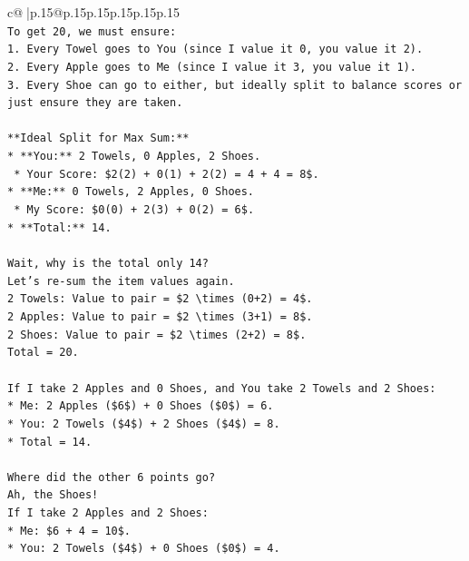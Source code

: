 \documentclass{article}
\begin{document}
{\begin{supertabular}{c@{$\;$}|p{.15\linewidth}@{}p{.15\linewidth}p{.15\linewidth}p{.15\linewidth}p{.15\linewidth}p{.15\linewidth}}
{{{\\ 
\texttt{To get 20, we must ensure:} \\
\texttt{1.  Every Towel goes to You (since I value it 0, you value it 2).} \\
\texttt{2.  Every Apple goes to Me (since I value it 3, you value it 1).} \\
\texttt{3.  Every Shoe can go to either, but ideally split to balance scores or just ensure they are taken.} \\
\\ 
\texttt{**Ideal Split for Max Sum:**} \\
\texttt{*   **You:** 2 Towels, 0 Apples, 2 Shoes.} \\
\texttt{    *   Your Score: \$2(2) + 0(1) + 2(2) = 4 + 4 = 8\$.} \\
\texttt{*   **Me:** 0 Towels, 2 Apples, 0 Shoes.} \\
\texttt{    *   My Score: \$0(0) + 2(3) + 0(2) = 6\$.} \\
\texttt{*   **Total:** 14.} \\
\\ 
\texttt{Wait, why is the total only 14?} \\
\texttt{Let's re{-}sum the item values again.} \\
\texttt{2 Towels: Value to pair = \$2 \textbackslash{}times (0+2) = 4\$.} \\
\texttt{2 Apples: Value to pair = \$2 \textbackslash{}times (3+1) = 8\$.} \\
\texttt{2 Shoes: Value to pair = \$2 \textbackslash{}times (2+2) = 8\$.} \\
\texttt{Total = 20.} \\
\\ 
\texttt{If I take 2 Apples and 0 Shoes, and You take 2 Towels and 2 Shoes:} \\
\texttt{*   Me: 2 Apples (\$6\$) + 0 Shoes (\$0\$) = 6.} \\
\texttt{*   You: 2 Towels (\$4\$) + 2 Shoes (\$4\$) = 8.} \\
\texttt{*   Total = 14.} \\
\\ 
\texttt{Where did the other 6 points go?} \\
\texttt{Ah, the Shoes!} \\
\texttt{If I take 2 Apples and 2 Shoes:} \\
\texttt{*   Me: \$6 + 4 = 10\$.} \\
\texttt{*   You: 2 Towels (\$4\$) + 0 Shoes (\$0\$) = 4.} \\
}}}
\end{supertabular}}
\end{document}
